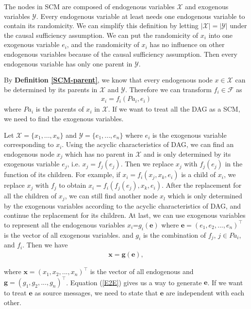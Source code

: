 \documentclass[twoside,11pt]{article}
\begin{document}
The nodes in SCM are composed of endogenous variables $\mathcal X$ and exogenous variables $\mathcal Y$. Every endogenous variable at least needs one endogenous variable to contain its randomicity. We can simplify this definition by letting $|\mathcal X|=|\mathcal Y|$ under the causal sufficiency assumption. We can put the randomicity of $x_i$ into one exogenous variable $e_i$, and the randomicity of $x_i$ has no influence on other endogenous variables because of the causal sufficiency assumption. Then every endogenous variable has only one parent in $\mathcal Y$.

By \textbf{Definition \ref{SCM-parent}}, we know that every endogenous node $x\in\mathcal X$ can be determined by its parents in $\mathcal X$ and $\mathcal Y$. Therefore we can transform $f_i\in\mathcal F$ as 
\begin{align*}
    x_i=f_i(Pa_i, e_i)
\end{align*}
where $Pa_i$ is the parents of $x_i$ in $\mathcal X$. If we want to treat all the DAG as a SCM, we need to find the exogenous variables.

Let $\mathcal X=\{x_1, ..., x_n\}$ and $\mathcal Y=\{e_1, ..., e_n\}$ where $e_i$ is the exogenous variable corresponding to $x_i$. Using the acyclic characteristics of DAG, we can find an endogenous node $x_j$ which has no parent in $\mathcal X$ and is only determined by its exogenous variable $e_j$, i.e. $x_j=f_j(e_j)$. Then we replace $x_j$ with $f_j(e_j)$ in the function of its children. For example, if $x_i=f_i(x_j, x_k, e_i)$ is a child of $x_i$, we replace $x_j$ with $f_j$ to obtain $x_i=f_i(f_j(e_j), x_k, e_i)$. After the replacement for all the children of $x_j$, we can still find another node $x_l$ which is only determined by the exogenous variables according to the acyclic characteristics of DAG, and continue the replacement for its children. At last, we can use exogenous variables to represent all the endogenous variables $x_i$=$g_i(\mathbf e)$ where $\mathbf e=(e_1, e_2, ..., e_n)^\top$ is the vector of all exogenous variables. and $g_i$ is the combination of $f_j$, $j\in Pa_i$, and $f_i$. Then we have
\begin{align}
\label{E2E}
\mathbf x=\mathbf g(\mathbf e),
\end{align}

where $\mathbf x=(x_1, x_2, ..., x_n)^\top$ is the vector of all endogenous and $\mathbf g=(g_1, g_2, ..., g_n)^\top$. Equation (\ref{E2E}) gives us a way to generate $\mathbf e$. If we want to treat $\mathbf e$ as source messages, we need to state that $\mathbf e$ are independent with each other. 
\end{document}
